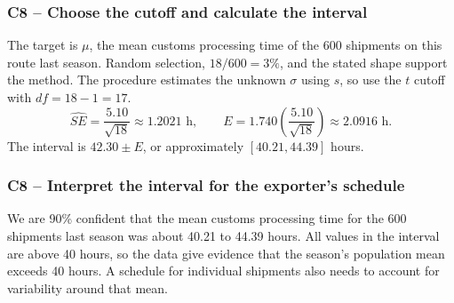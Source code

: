 
	\label{sol:c8-2-a}
	\subsubsection*{C8 -- Choose the cutoff and calculate the interval}

	The target is $\mu$, the mean customs processing time of the 600 shipments on this route last season. Random selection, $18/600=3\%$, and the stated shape support the method. The procedure estimates the unknown $\sigma$ using $s$, so use the $t$ cutoff with $df=18-1=17$.
	\[
	\widehat{SE}=\frac{5.10}{\sqrt{18}}\approx1.2021\text{ h},\qquad
	E=1.740\left(\frac{5.10}{\sqrt{18}}\right)\approx2.0916\text{ h}.
	\]
	The interval is $42.30\pm E$, or approximately $[40.21,44.39]$ hours.


	\label{sol:c8-2-b}
	\subsubsection*{C8 -- Interpret the interval for the exporter's schedule}

	We are 90\% confident that the mean customs processing time for the 600 shipments last season was about 40.21 to 44.39 hours. All values in the interval are above 40 hours, so the data give evidence that the season's population mean exceeds 40 hours. A schedule for individual shipments also needs to account for variability around that mean.




